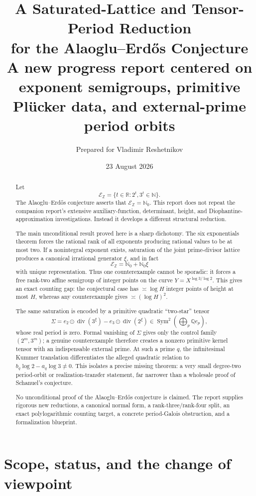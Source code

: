 \documentclass[11pt]{article}
\title{\textbf{A Saturated-Lattice and Tensor-Period Reduction\\
for the Alaoglu--Erd\H{o}s Conjecture}\\[0.5em]
\large A new progress report centered on exponent semigroups, primitive Pl\"ucker data, and external-prime period orbits}
\author{Prepared for Vladimir Reshetnikov}
\date{23 August 2026}
\theoremstyle{definition}
\newcommand{\Q}{\mathbb{Q}}
\newcommand{\R}{\mathbb{R}}
\newcommand{\Z}{\mathbb{Z}}
\newcommand{\N}{\mathbb{N}}
\newcommand{\divv}{\operatorname{div}}
\newcommand{\Sym}{\operatorname{Sym}}
\newcommand{\Eint}{\mathcal E_{\!\Z}}
\newcommand{\tensorstar}{\mathbin{\odot}}
\begin{document}
\maketitle

\begin{abstract}
Let
\[
  \Eint=\{t\in\R:2^t,3^t\in\N\}.
\]
The Alaoglu--Erd\H{o}s conjecture asserts that \(\Eint=\N_0\).  This report does not repeat the companion report's extensive auxiliary-function, determinant, height, and Diophantine-approximation investigations.  Instead it develops a different structural reduction.

The main unconditional result proved here is a sharp dichotomy.  The six exponentials theorem forces the rational rank of all exponents producing rational values to be at most two.  If a nonintegral exponent exists, saturation of the joint prime-divisor lattice produces a canonical irrational generator \(\xi\), and in fact
\[
  \Eint=\N_0+\N_0\xi
\]
with unique representation.  Thus one counterexample cannot be sporadic: it forces a free rank-two affine semigroup of integer points on the curve \(Y=X^{\log 3/\log 2}\).  This gives an exact counting gap: the conjectural case has \(\asymp\log H\) integer points of height at most \(H\), whereas any counterexample gives \(\asymp(\log H)^2\).

The same saturation is encoded by a primitive quadratic ``two-star'' tensor
\[
 \Sigma=e_2\tensorstar\divv(3^\xi)-e_3\tensorstar\divv(2^\xi)
 \in \Sym^2\!\left(\bigoplus_p\Q e_p\right),
\]
whose real period is zero.  Formal vanishing of \(\Sigma\) gives only the control family \((2^m,3^m)\); a genuine counterexample therefore creates a nonzero primitive kernel tensor with an indispensable external prime.  At such a prime \(q\), the infinitesimal Kummer translation differentiates the alleged quadratic relation to
\(b_q\log2-a_q\log3\ne0\).  This isolates a precise missing theorem: a very small degree-two period-orbit or realization-transfer statement, far narrower than a wholesale proof of Schanuel's conjecture.

No unconditional proof of the Alaoglu--Erd\H{o}s conjecture is claimed.  The report supplies rigorous new reductions, a canonical normal form, a rank-three/rank-four split, an exact polylogarithmic counting target, a concrete period-Galois obstruction, and a formalization blueprint.
\end{abstract}

\tableofcontents
\newpage

\section{Scope, status, and the change of viewpoint}
\end{document}
